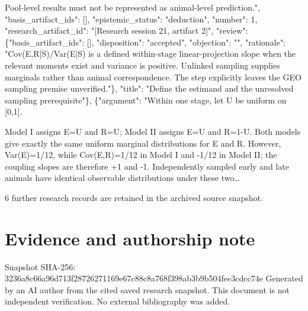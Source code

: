 \documentclass[11pt]{article}
\begin{document}
Pool-level results must not be represented as animal-level prediction.", "basis\_artifact\_ids": [], "epistemic\_status": "deduction", "number": 1, "research\_artifact\_id": "[Research session 21, artifact 2]", "review": \{"basis\_artifact\_ids": [], "disposition": "accepted", "objection": "", "rationale": "Cov(E,R|S)/Var(E|S) is a defined within-stage linear-projection slope when the relevant moments exist and variance is positive. Unlinked sampling supplies marginals rather than animal correspondence. The step explicitly leaves the GEO sampling premise unverified."\}, "title": "Define the estimand and the unresolved sampling prerequisite"\}, \{"argument": "Within one stage, let U be uniform on [0,1].

Model I assigns E=U and R=U; Model II assigns E=U and R=1-U. Both models give exactly the same uniform marginal distributions for E and R. However, Var(E)=1/12, while Cov(E,R)=1/12 in Model I and -1/12 in Model II; the coupling slopes are therefore +1 and -1. Independently sampled early and late animals have identical observable distributions under these two\ldots{}

6 further research records are retained in the archived source snapshot.
\section*{Evidence and authorship note}
Snapshot SHA-256: 3236a8c66a96d713f28726271169e67c88c8a768f398ab3b9b504fee3cdcc74e
Generated by an AI author from the cited saved research snapshot. This document is not independent verification. No external bibliography was added.
\end{document}

